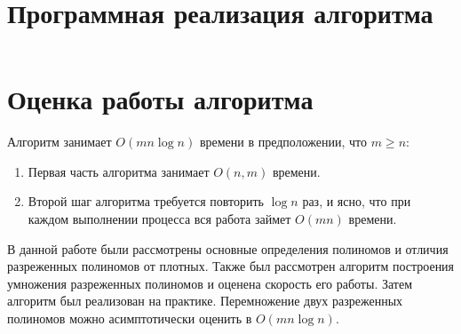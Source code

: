 \documentclass[bachelor, och, labwork]{shiza}
\begin{document}
\section{Программная реализация алгоритма}

\inputminted[linenos,breaklines=true, fontsize=\small, style=bw]{python}{3.py}



\section{Оценка работы алгоритма}

Алгоритм занимает $O(mn\log n)$ времени в предположении, что $m \ge n$:
\begin{enumerate}
    \item Первая часть алгоритма занимает $O(n,m)$ времени.
    \item Второй шаг алгоритма требуется повторить $\log n$ раз, и ясно, что при
          каждом выполнении процесса вся работа займет $O(mn)$ времени.
\end{enumerate}

\conclusion

В данной работе были рассмотрены основные определения полиномов и отличия
разреженных полиномов от плотных. Также был рассмотрен алгоритм построения
умножения разреженных полиномов и оценена скорость его работы. Затем алгоритм 
был реализован на практике. Перемножение двух разреженных полиномов можно 
асимптотически оценить в $O(mn\log n)$.
\end{document}
